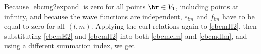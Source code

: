 
Because \eqref{ebcmg2expand} is zero for all points $\br \in V_1$, including points at infinity, and because the wave functions are independent, $e_{lm}$ and $f_{lm}$ have to be equal to zero for all $(l,m)$. Applying the curl relations again to \eqref{ebcmH2}, then substituting \eqref{ebcmE2} and \eqref{ebcmH2} into both \eqref{ebcmclm} and \eqref{ebcmdlm}, and using a different summation index, we get
\vspace{-3mm}

